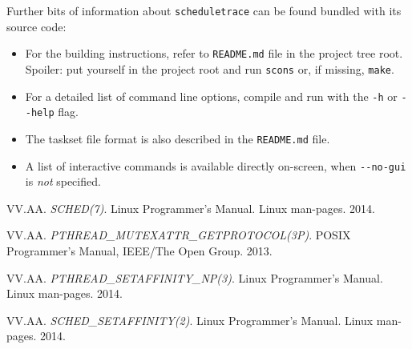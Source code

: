 \documentclass[paper=a4, fontsize=11pt]{scrartcl}
\newcommand{\mono}[1]{\texttt{#1}}
\numberwithin{equation}{section}        %
\numberwithin{figure}{section}          %
\numberwithin{table}{section}               %
\numberwithin{fragment}{section}
\begin{document}
Further bits of information about \mono{scheduletrace} can be found bundled with its source code:

\begin{itemize}
\item For the building instructions, refer to \mono{README.md} file in the project tree root. Spoiler: put yourself in the project root and run \mono{scons} or, if missing, \mono{make}.
\item For a detailed list of command line options, compile and run with the \mono{-h} or \mono{-{}-help} flag.
\item The taskset file format is also described in the \mono{README.md} file.
\item A list of interactive commands is available directly on-screen, when \mono{-{}-no-gui} is \textit{not} specified.
\end{itemize}

\begin{thebibliography}{99}

  VV.AA.
  \textit{SCHED(7)}.
  Linux Programmer's Manual.
  Linux man-pages.
  2014.

  VV.AA.
  \textit{PTHREAD\_MUTEXATTR\_GETPROTOCOL(3P)}.
  POSIX Programmer's Manual,
  IEEE/The Open Group.
  2013.

  VV.AA.
  \textit{PTHREAD\_SETAFFINITY\_NP(3)}.
  Linux Programmer's Manual.
  Linux man-pages.
  2014.

  VV.AA.
  \textit{SCHED\_SETAFFINITY(2)}.
  Linux Programmer's Manual.
  Linux man-pages.
  2014.

\end{thebibliography}
\end{document}
